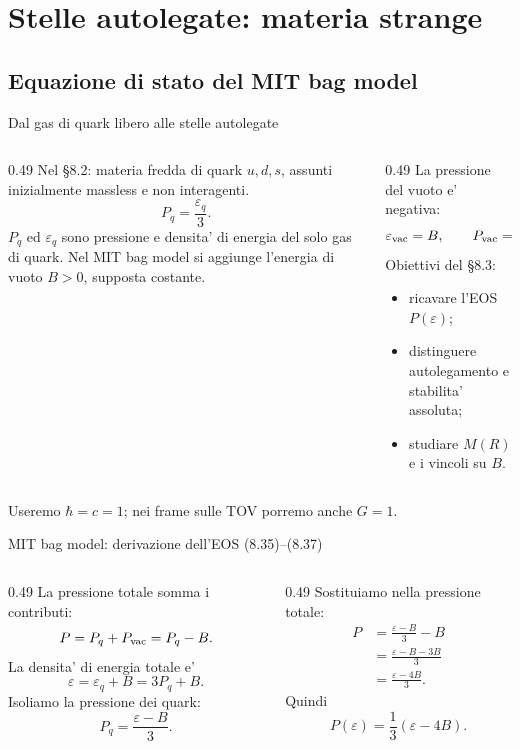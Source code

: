 \section{Stelle autolegate: materia strange}

\subsection{Equazione di stato del MIT bag model}

\begin{frame}{Dal gas di quark libero alle stelle autolegate}
\small
\begin{columns}[T,onlytextwidth]
\begin{column}{0.49\textwidth}
Nel \S8.2: materia fredda di quark $u,d,s$,
assunti inizialmente massless e non interagenti.
\[
P_q=\frac{\varepsilon_q}{3}.
\]
$P_q$ ed $\varepsilon_q$ sono pressione e densita'
di energia del solo gas di quark.
\medskip
Nel MIT bag model si aggiunge l'energia
di vuoto $B>0$, supposta costante.
\end{column}
\begin{column}{0.49\textwidth}
La pressione del vuoto e' negativa:
\[
\varepsilon_{\rm vac}=B,\qquad
P_{\rm vac}=-B.
\]
Obiettivi del \S8.3:
\begin{itemize}
\item ricavare l'EOS $P(\varepsilon)$;
\item distinguere autolegamento e stabilita' assoluta;
\item studiare $M(R)$ e i vincoli su $B$.
\end{itemize}
\end{column}
\end{columns}
\medskip
Useremo $\hbar=c=1$; nei frame sulle TOV porremo anche $G=1$.
\end{frame}

\begin{frame}{MIT bag model: derivazione dell'EOS (8.35)--(8.37)}
\small
\begin{columns}[T,onlytextwidth]
\begin{column}{0.49\textwidth}
La pressione totale somma i contributi:
\[
P=P_q+P_{\rm vac}=P_q-B.
\]
La densita' di energia totale e'
\[
\varepsilon=\varepsilon_q+B=3P_q+B.
\]
Isoliamo la pressione dei quark:
\[
P_q=\frac{\varepsilon-B}{3}.
\]
\end{column}
\begin{column}{0.49\textwidth}
Sostituiamo nella pressione totale:
\begin{align*}
P&=\frac{\varepsilon-B}{3}-B\\
 &=\frac{\varepsilon-B-3B}{3}\\
 &=\frac{\varepsilon-4B}{3}.
\end{align*}
Quindi
\[
P(\varepsilon)=\frac13(\varepsilon-4B).
\]
\end{column}
\end{columns}
\end{frame}

